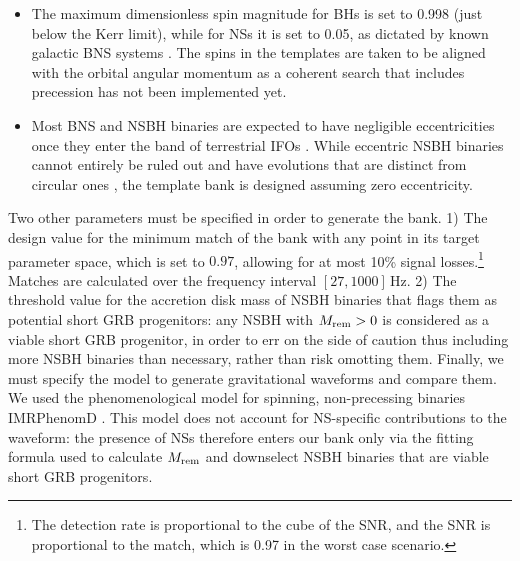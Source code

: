 \documentclass[binding=0.6cm, LaM]{sapthesis}
\begin{document}
\begin{itemize}
        \item The maximum dimensionless spin magnitude for BHs is set to 0.998 (just below the Kerr limit), while for NSs it is set to 0.05, as dictated by known galactic BNS systems \cite{97}.  The spins in the templates are taken to be aligned with the orbital angular momentum as a coherent search that includes precession has not been implemented yet.
        \item Most BNS and NSBH binaries
        are expected to have negligible eccentricities once they enter the band of terrestrial IFOs \cite{86}.
        While eccentric NSBH binaries cannot entirely be ruled out
        and have evolutions that are distinct from circular ones \cite{71},
        the template bank is designed assuming zero eccentricity.
      \end{itemize}

      Two other parameters must be specified in order to generate the bank.  
	1) The design value for the minimum match of the bank with any point in its target parameter space, which is set to $0.97$, allowing for at most 10\% signal losses.\footnote{The detection rate is proportional to the cube of the SNR, and the SNR is proportional to the match, which is 0.97 in the worst case scenario.}  Matches are calculated over the frequency interval $[27, 1000]\,$Hz. 2) The threshold value for the accretion disk mass of NSBH binaries that flags them as potential short GRB progenitors: any NSBH with $M_{\rm rem}>0$ is considered as a viable short GRB progenitor, in order to err on the side of caution thus including more NSBH binaries than necessary, rather than risk omotting them.
      Finally, we must specify the model to generate gravitational waveforms and compare them.  We used the phenomenological model for spinning, non-precessing binaries {\ttfamily IMRPhenomD} \cite{106}.  This model does not account for NS-specific contributions to the waveform: the presence of NSs therefore enters our bank only via the fitting formula used to calculate $M_{\rm rem}$ and downselect NSBH binaries that are viable short GRB progenitors.
\end{document}
